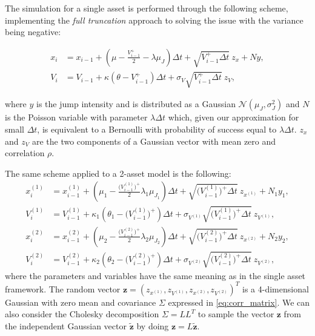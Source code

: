 The simulation for a single asset is performed through the following scheme, implementing the \textit{full truncation} approach to solving the issue with the variance being negative:

\begin{subequations}
	\label{eq:bates_sim}
	\begin{align}
	x_i &= x_{i-1} + (\mu -  \frac{V_{i-1}^+}{2}- \lambda \mu_J)\Delta t + \sqrt{V_{i-1}^+ \Delta t} \:z_x + N y, \\
	V_i &= V_{i-1} + \kappa(\theta - V_{i-1}^+ )\Delta t + \sigma_V \sqrt{V_{i-1}^+ \Delta t} \: z_V,
	\end{align}
\end{subequations}

where $y$ is the jump intensity and is distributed as a Gaussian $\mathcal{N}(\mu_J, \sigma_J^2)$ and $N$ is the Poisson variable with parameter $\lambda \Delta t$ which, given our approximation for small $\Delta t$, is equivalent to a Bernoulli with probability of success equal to $\lambda \Delta t$. 
$z_x$ and $z_V$ are the two components of a Gaussian vector with mean zero and correlation $\rho$.

The same scheme applied to a  2-asset model is the following:
\begin{subequations}
	\label{eq:bates_full_truncation2}
	\begin{align}
	x_i^{(1)} &= x_{i-1}^{(1)} + (\mu_1 -  \frac{\Big(V_{i-1}^{(1)}\Big)^+}{2} \lambda_1\mu_{J_1})\Delta t + \sqrt{\Big(V_{i-1}^{(1)}\Big)^+ \Delta t} \:z_{x^{(1)}} + N_1 y_1, \\
	V_i^{(1)} &= V_{i-1}^{(1)} + \kappa_1(\theta_1 - \Big(V_{i-1}^{(1)}\Big)^+ )\Delta t + \sigma_{V^{(1)}} \sqrt{\Big(V_{i-1}^{(1)}\Big)^+ \Delta t} \: z_{V^(1)},\\
	x_i^{(2)} &= x_{i-1}^{(2)} + (\mu_2 -  \frac{\Big(V_{i-1}^{(2)}\Big)^+}{2} \lambda_2 \mu_{J_2})\Delta t + \sqrt{\Big(V_{i-1}^{(2)}\Big)^+\Delta t} \:z_{x^{(2)}} + N_2 y_2, \\
	V_i^{(2)} &= V_{i-1}^{(2)} + \kappa_2(\theta_2 - \Big(V_{i-1}^{(2)}\Big)^+ )\Delta t + \sigma_{V^{(2)}} \sqrt{\Big(V_{i-1}^{(2)}\Big)^+ \Delta t} \: z_{V^{(2)}},
	\end{align}
\end{subequations}
where the parameters and variables have the same meaning as in the single asset framework.
The random vector $\mathbf{z} = (z_{x^{(1)}}, z_{V^{(1)}}, z_{x^{(2)}}, z_{V^{(2)}})^T$ is a 4-dimensional Gaussian with zero mean and covariance $\Sigma$ expressed in \eqref{eq:corr_matrix}. We can also consider the Cholesky decomposition $\Sigma= L L^T$ to sample the vector $\mathbf{z}$ from the independent Gaussian vector $\mathbf{\tilde{z}}$ by doing $\mathbf{z} = L \mathbf{\tilde{z}}$.

